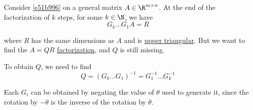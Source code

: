 \label{cd43082}

Consider \autoref{e51b996} on a general matrix $A\in\R^{m\times n}$. At the end
of the factorization of $k$ steps, for some $k\in\N$, we have
$$
  G_k\ldots G_1A=R
$$

where $R$ has the same dimensions as $A$ and is \href{c39b6bf}{upper
triangular}. But we want to find the $A=QR$ \href{c465f7c}{factorization}, and
$Q$ is still missing.

To obtain $Q$, we need to find
$$
  Q=(G_k\ldots G_1)^{-1}=G_1^{-1}\ldots G_k^{-1}
$$

Each $G_i$ can be obtained by negating the value of $\theta$ used to generate
it, since the rotation by $-\theta$ is the inverse of the rotation by $\theta$.
